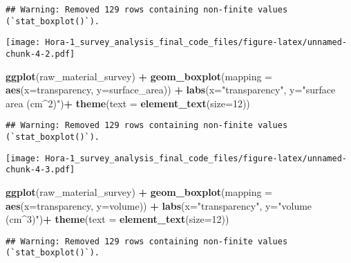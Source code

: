 \documentclass[
]{article}
\newenvironment{Shaded}{\begin{snugshade}}{\end{snugshade}}
\newcommand{\AttributeTok}[1]{\textcolor[rgb]{0.13,0.29,0.53}{#1}}
\newcommand{\DecValTok}[1]{\textcolor[rgb]{0.00,0.00,0.81}{#1}}
\newcommand{\FunctionTok}[1]{\textcolor[rgb]{0.13,0.29,0.53}{\textbf{#1}}}
\newcommand{\NormalTok}[1]{#1}
\newcommand{\SpecialCharTok}[1]{\textcolor[rgb]{0.81,0.36,0.00}{\textbf{#1}}}
\newcommand{\StringTok}[1]{\textcolor[rgb]{0.31,0.60,0.02}{#1}}
\begin{document}
\begin{verbatim}
## Warning: Removed 129 rows containing non-finite values (`stat_boxplot()`).
\end{verbatim}

\texttt{[image: Hora-1\_survey\_analysis\_final\_code\_files/figure-latex/unnamed-chunk-4-2.pdf]}

\begin{Shaded}
\begin{Highlighting}[]
\FunctionTok{ggplot}\NormalTok{(raw\_material\_survey) }\SpecialCharTok{+}
  \FunctionTok{geom\_boxplot}\NormalTok{(}\AttributeTok{mapping =} \FunctionTok{aes}\NormalTok{(}\AttributeTok{x=}\NormalTok{transparency, }\AttributeTok{y=}\NormalTok{surface\_area)) }\SpecialCharTok{+} 
  \FunctionTok{labs}\NormalTok{(}\AttributeTok{x=}\StringTok{"transparency"}\NormalTok{, }\AttributeTok{y=}\StringTok{"surface area (cm\^{}2)"}\NormalTok{)}\SpecialCharTok{+}
  \FunctionTok{theme}\NormalTok{(}\AttributeTok{text =} \FunctionTok{element\_text}\NormalTok{(}\AttributeTok{size=}\DecValTok{12}\NormalTok{))}
\end{Highlighting}
\end{Shaded}

\begin{verbatim}
## Warning: Removed 129 rows containing non-finite values (`stat_boxplot()`).
\end{verbatim}

\texttt{[image: Hora-1\_survey\_analysis\_final\_code\_files/figure-latex/unnamed-chunk-4-3.pdf]}

\begin{Shaded}
\begin{Highlighting}[]
\FunctionTok{ggplot}\NormalTok{(raw\_material\_survey) }\SpecialCharTok{+}
  \FunctionTok{geom\_boxplot}\NormalTok{(}\AttributeTok{mapping =} \FunctionTok{aes}\NormalTok{(}\AttributeTok{x=}\NormalTok{transparency, }\AttributeTok{y=}\NormalTok{volume)) }\SpecialCharTok{+} 
  \FunctionTok{labs}\NormalTok{(}\AttributeTok{x=}\StringTok{"transparency"}\NormalTok{, }\AttributeTok{y=}\StringTok{"volume (cm\^{}3)"}\NormalTok{)}\SpecialCharTok{+}
  \FunctionTok{theme}\NormalTok{(}\AttributeTok{text =} \FunctionTok{element\_text}\NormalTok{(}\AttributeTok{size=}\DecValTok{12}\NormalTok{))}
\end{Highlighting}
\end{Shaded}

\begin{verbatim}
## Warning: Removed 129 rows containing non-finite values (`stat_boxplot()`).
\end{verbatim}
\end{document}
